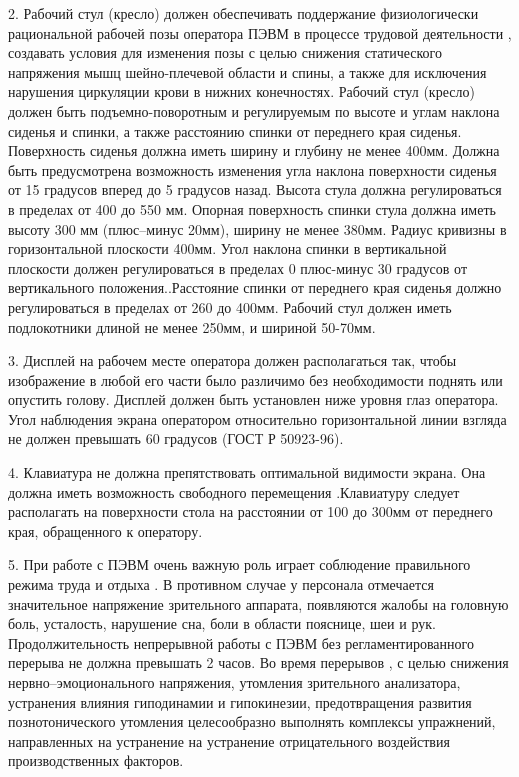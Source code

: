 2. Рабочий стул (кресло) должен обеспечивать поддержание физиологически 
рациональной рабочей позы оператора ПЭВМ в процессе трудовой 
деятельности , создавать условия для изменения позы с целью снижения 
статического напряжения мышц шейно-плечевой области и спины, а также
для исключения нарушения циркуляции крови в нижних конечностях.
Рабочий стул (кресло) должен быть подъемно-поворотным и регулируемым
по высоте и углам наклона сиденья и спинки, а также расстоянию спинки от 
переднего края сиденья. Поверхность сиденья должна иметь ширину и глубину не менее 400мм.
Должна быть предусмотрена возможность изменения угла наклона поверхности сиденья от 15
градусов вперед  до 5 градусов назад. Высота стула должна регулироваться в пределах от 400 до
550 мм. Опорная поверхность спинки стула должна иметь высоту  300 мм (плюс--минус 20мм),
ширину не менее 380мм. Радиус кривизны в горизонтальной плоскости 400мм.
Угол наклона спинки в вертикальной плоскости должен регулироваться
 в пределах 0 плюс-минус 30 градусов от вертикального положения..Расстояние
спинки от переднего края сиденья должно регулироваться в пределах от 260
до 400мм. Рабочий стул должен иметь подлокотники длиной не менее 250мм, 
и шириной 50-70мм.


3. Дисплей на рабочем месте оператора  должен располагаться так, чтобы 
изображение в любой его части было различимо без необходимости поднять
или опустить голову. Дисплей должен быть установлен ниже уровня глаз оператора.
Угол наблюдения экрана оператором относительно горизонтальной линии взгляда не должен
превышать 60 градусов (ГОСТ Р 50923-96).



4. Клавиатура не должна препятствовать оптимальной видимости экрана. Она 
должна иметь возможность свободного перемещения .Клавиатуру следует
располагать на поверхности стола на расстоянии  от 100 до 300мм  от переднего
края, обращенного к оператору.


5. При работе с ПЭВМ очень важную роль играет соблюдение правильного 
режима труда и отдыха . В противном случае у персонала отмечается значительное напряжение
зрительного аппарата, появляются жалобы на головную боль, усталость, нарушение сна, боли в
области пояснице, шеи и рук. Продолжительность непрерывной работы с ПЭВМ без регламентированного
перерыва не должна превышать 2 часов. Во время перерывов , с целью снижения нервно--эмоционального
напряжения, утомления зрительного анализатора, устранения влияния гиподинамии и гипокинезии,
предотвращения развития познотонического утомления целесообразно выполнять комплексы упражнений,
направленных на устранение на устранение отрицательного воздействия производственных факторов.


